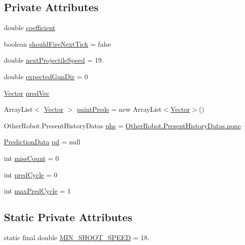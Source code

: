 \subsection*{Private Attributes}
\begin{DoxyCompactItemize}
\item 
double \hyperlink{classmega_1_1boirlerplate_1_1_gun_predictive_adb89d8361c33446c988ec16765cab95f}{coefficient}
\item 
boolean \hyperlink{classmega_1_1boirlerplate_1_1_gun_predictive_afe969b433ba483c7a6334799599b7cff}{should\+Fire\+Next\+Tick} = false
\item 
double \hyperlink{classmega_1_1boirlerplate_1_1_gun_predictive_adc36b046a5e31ee5d2664cfb4fea369f}{next\+Projectile\+Speed} = 19.
\item 
double \hyperlink{classmega_1_1boirlerplate_1_1_gun_predictive_a4a0b2e418a667179cf2c45bbceedc85a}{expected\+Gun\+Dir} = 0
\item 
\hyperlink{classmega_1_1boirlerplate_1_1_vector}{Vector} \hyperlink{classmega_1_1boirlerplate_1_1_gun_predictive_aacfa7c3d0fc4977c5154cbc3d2365ded}{pred\+Vec}
\item 
Array\+List$<$ \hyperlink{classmega_1_1boirlerplate_1_1_vector}{Vector} $>$ \hyperlink{classmega_1_1boirlerplate_1_1_gun_predictive_aa66bd4fc69ac06e20126c49af21ba460}{paint\+Preds} = new Array\+List$<$\hyperlink{classmega_1_1boirlerplate_1_1_vector}{Vector}$>$()
\item 
Other\+Robot.\+Present\+History\+Datas \hyperlink{classmega_1_1boirlerplate_1_1_gun_predictive_a74b25aefd3b3eaa8fc0d5d0714f90172}{phs} = \hyperlink{enummega_1_1boirlerplate_1_1_other_robot_1_1_present_history_datas_a8ddada05524af32249f4a38284dc0de8}{Other\+Robot.\+Present\+History\+Datas.\+none}
\item 
\hyperlink{classmega_1_1boirlerplate_1_1_prediction_data}{Prediction\+Data} \hyperlink{classmega_1_1boirlerplate_1_1_gun_predictive_ad3c63543d31fc50f31e40871c78ee4d4}{pd} = null
\item 
int \hyperlink{classmega_1_1boirlerplate_1_1_gun_predictive_aefc4364e0799c5ca57922c9ddb56b82a}{miss\+Count} = 0
\item 
int \hyperlink{classmega_1_1boirlerplate_1_1_gun_predictive_a306e9864f6e2fa7665a2f58518f997fc}{pred\+Cycle} = 0
\item 
int \hyperlink{classmega_1_1boirlerplate_1_1_gun_predictive_a36474df070e6133cd3f64e1f6e6dd177}{max\+Pred\+Cycle} = 1
\end{DoxyCompactItemize}
\subsection*{Static Private Attributes}
\begin{DoxyCompactItemize}
\item 
static final double \hyperlink{classmega_1_1boirlerplate_1_1_gun_predictive_abf62a5296b23883713c3e5684befe449}{M\+I\+N\+\_\+\+S\+H\+O\+O\+T\+\_\+\+S\+P\+E\+ED} = 18.
\end{DoxyCompactItemize}
